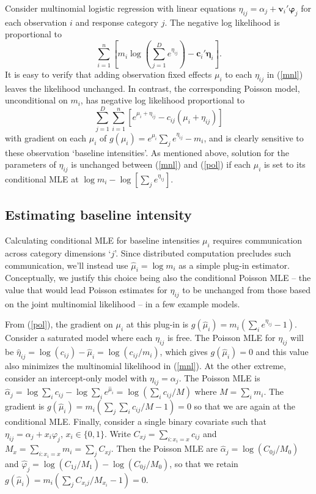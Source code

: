 \documentclass[12pt]{article}
\newcommand{\bs}[1]{\boldsymbol{#1}}
\newcommand{\bm}[1]{\mathbf{#1}}
\begin{document}
Consider multinomial logistic regression with linear equations $\eta_{ij} =
\alpha_{j} + \bm{v}_i'\bs{\varphi}_j$ for each observation $i$ and response
category $j$.  The negative log likelihood is proportional to 
\begin{equation}
\label{mnl} \sum_{i=1}^n\left[ m_i\log\left(\sum_{j=1}^D e^{\eta_{ij}}\right)
- \bm{c}_{i}'\bs{\eta}_{i} \right]. 
\end{equation} 
It is easy to verify that adding observation fixed effects $\mu_i$ to each
$\eta_{ij}$ in (\ref{mnl}) leaves the likelihood unchanged.  In contrast, the
corresponding Poisson model, unconditional on $m_i$, has negative log
likelihood proportional to 
\begin{equation} \label{pol}
\sum_{j=1}^D\sum_{i=1}^n\left[ e^{\mu_i + \eta_{ij}} - c_{ij}(\mu_i +
\eta_{ij}) \right] 
\end{equation} 
with gradient on each $\mu_i$ of $g(\mu_i) =
e^{\mu_i}\sum_j e^{\eta_{ij}} - m_i$, and  is clearly sensitive to these
observation `baseline intensities'.  As mentioned above, solution for the
parameters of $\eta_{ij}$ is unchanged between (\ref{mnl}) and (\ref{pol}) if
each $\mu_i$ is set to its conditional MLE at $\log m_i - \log \left[\sum_j
e^{\eta_{ij}}\right]$.


\subsection{Estimating baseline intensity}
\label{MU}


Calculating conditional MLE for baseline intensities $\mu_i$ requires
communication across category dimensions `$j$'. Since distributed computation
precludes such communication, we'll instead use  $\hat \mu_i = \log m_i$ as a
simple plug-in estimator. Conceptually, we justify this choice being also the
conditional Poisson MLE -- the value that would lead  Poisson estimates for
$\eta_{ij}$ to be unchanged from those based on the  joint multinomial
likelihood  -- in a few example models.

From (\ref{pol}), the gradient on $\mu_i$ at this plug-in is $g(\hat \mu_i) =
m_i \left(\sum_i e^{\eta_{ij}}-1\right)$.  Consider a saturated model where
each $\eta_{ij}$ is free.  The Poisson MLE for $\eta_{ij}$ will be $\hat
\eta_{ij} = \log(c_{ij}) - \hat \mu_i = \log(c_{ij}/m_i)$, which gives $g(\hat
\mu_i) = 0$ and this value also minimizes the multinomial likelihood in (\ref{mnl}).   At
the other extreme, consider an intercept-only model with $\eta_{ij} =
\alpha_j$.  The Poisson MLE is $\hat\alpha_j = \log \sum_i c_{ij} - \log
\sum_i e^{\hat\mu_i} = \log\left( \sum_i c_{ij}/M \right)$ where $M = \sum_i
m_i$.  The gradient is $g(\hat \mu_i) = m_i(\sum_j \sum_i c_{ij}/M -1) =
0$ so that we are again at the conditional MLE. Finally, consider a single
binary covariate such that $\eta_{ij} = \alpha_j + x_i \varphi_j$, $x_i \in
\{0,1\}$.  Write $C_{xj} = \sum_{i: x_i=x} c_{ij}$ and  $M_{x} = \sum_{i:
x_i=x} m_i = \sum_j C_{xj}$.  Then the Poisson MLE are $\hat\alpha_j =
\log(C_{0j}/M_0)$ and $\hat\varphi_j = \log(C_{1j}/M_1) - \log(C_{0j}/M_0)$,
so that we retain $g(\hat \mu_i) = m_i\left(\sum_j C_{x_ij}/M_{x_i} -1 \right)
=0$.
\end{document}
